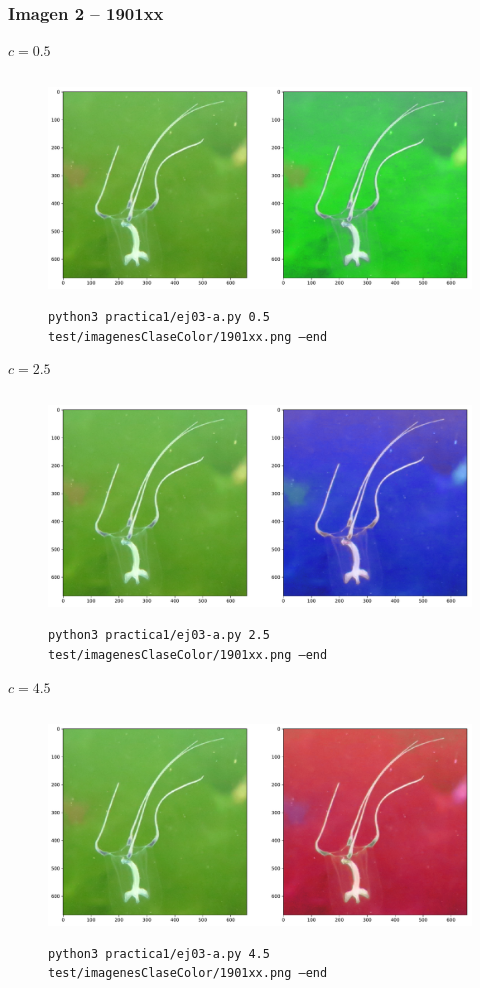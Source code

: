 \documentclass[11pt, spanish]{article}
\begin{document}
\subsubsection*{Imagen 2 -- 1901xx}
$c = 0.5$
\begin{figure}[H]
\centering
  \includegraphics[height=6cm]{informe-imgs/ej03-4.pdf}
  \caption{\texttt{python3 practica1/ej03-a.py 0.5 test/imagenesClaseColor/1901xx.png --end}}
\end{figure}

$c = 2.5$
\begin{figure}[H]
\centering
  \includegraphics[height=6cm]{informe-imgs/ej03-5.pdf}
  \caption{\texttt{python3 practica1/ej03-a.py 2.5 test/imagenesClaseColor/1901xx.png --end}}
\end{figure}

$c = 4.5$
\begin{figure}[H]
\centering
  \includegraphics[height=6cm]{informe-imgs/ej03-6.pdf}
  \caption{\texttt{python3 practica1/ej03-a.py 4.5 test/imagenesClaseColor/1901xx.png --end}}
\end{figure}
\end{document}
